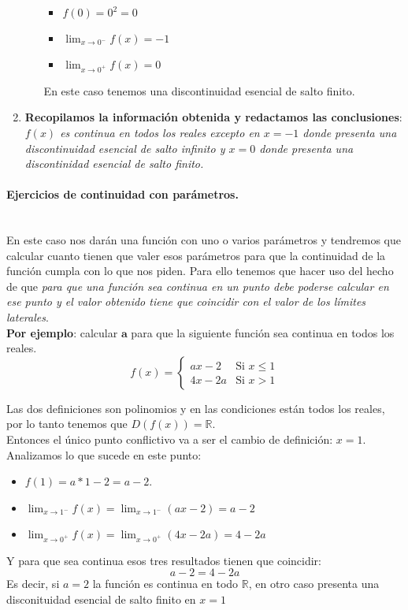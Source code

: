 \documentclass[a4paper,11pt,answers]{exam}
\begin{document}
\begin{solution}
\begin{enumerate}
\begin{itemize}
		\begin{itemize}
			\item $f(0) = 0^2 = 0$
			\item $\lim_{x \to 0^-} f(x) = -1$
			\item $\lim_{x \to 0^+} f(x) = 0$
		\end{itemize}
		En este caso tenemos una discontinuidad esencial de salto finito.
	\end{itemize}
	\item \textbf{Recopilamos la información obtenida y redactamos las conclusiones}:\\
	\textit{$f(x)$ es continua en todos los reales excepto en $x=-1$ donde presenta una discontinuidad esencial de salto infinito y $x=0$ donde presenta una discontinidad esencial de salto finito.}
\end{enumerate}
\end{solution}

\paragraph{Ejercicios de continuidad con parámetros.}\mbox{}\\
En este caso nos darán una función con uno o varios parámetros y tendremos que calcular cuanto tienen que valer esos parámetros para que la continuidad de la función cumpla con lo que nos piden. Para ello tenemos que hacer uso del hecho de que \textit{para que una función sea continua en un punto debe poderse calcular en ese punto y el valor obtenido tiene que coincidir con el valor de los límites laterales}.\\
\textbf{Por ejemplo}: calcular $\boldsymbol{a}$ para que la siguiente función sea continua en todos los reales.
\[f(x) = \left\lbrace \begin{array}{rr}
ax -2&\text{Si } x \leq 1\\
4x - 2a&\text{Si } x > 1
\end{array}\right.\]
\begin{solution}
Las dos definiciones son polinomios y en las condiciones están todos los reales, por lo tanto tenemos que $D(f(x)) = \mathbb{R}$.\\
Entonces el único punto conflictivo va a ser el cambio de definición: $x= 1$. Analizamos lo que sucede en este punto:
\begin{itemize}
	\item $f(1) = a*1 - 2= a-2$.
	\item $\lim_{x \to 1^-} f(x) = \lim_{x \to 1^-} (ax -2) = a-2$
	\item $\lim_{x \to 0^+} f(x) = \lim_{x \to 0^+} (4x -2a) = 4 - 2a$
\end{itemize}
Y para que sea continua esos tres resultados tienen que coincidir:
\[a-2 = 4 - 2a\]
Es decir, si $a= 2$ la función es continua en todo $\mathbb{R}$, en otro caso presenta una disconituidad esencial de salto finito en $x=1$
\end{solution}
\end{document}
